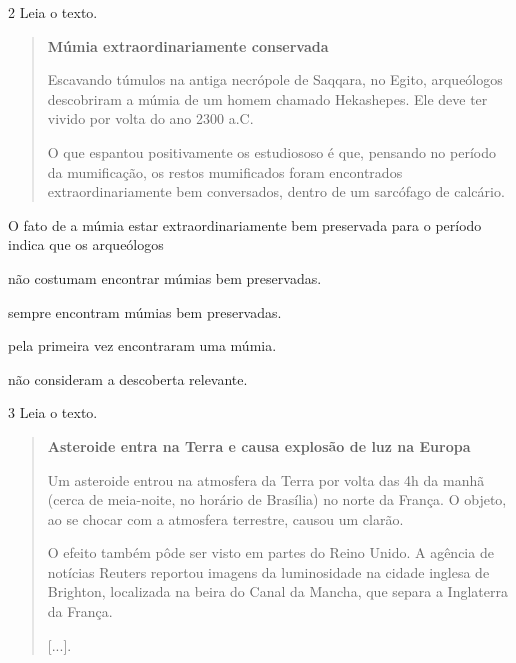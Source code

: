 
\num{2} Leia o texto.

\begin{quote}
\textbf{Múmia extraordinariamente conservada}

Escavando túmulos na antiga necrópole de Saqqara, no Egito, arqueólogos descobriram a múmia de um homem chamado Hekashepes. Ele deve ter vivido por volta do ano 2300 a.C.

O que espantou positivamente os estudiososo é que, pensando no período da mumificação, os restos mumificados foram encontrados extraordinariamente bem conversados, dentro de um sarcófago de calcário.

\end{quote}

O fato de a múmia estar extraordinariamente bem preservada para o período
indica que os arqueólogos

\begin{escolha}
\item não costumam encontrar múmias bem preservadas.

\item sempre encontram múmias bem preservadas.

\item pela primeira vez encontraram uma múmia.

\item não consideram a descoberta relevante.
\end{escolha}


\pagebreak
\num{3} Leia o texto.

\begin{quote}
\textbf{Asteroide entra na Terra e causa explosão de luz na Europa}

Um asteroide entrou na atmosfera da Terra por volta das 4h da manhã
(cerca de meia-noite, no horário de Brasília) no norte da França. O
objeto, ao se chocar com a atmosfera terrestre, causou um clarão.

O efeito também pôde ser visto em partes do Reino Unido. A agência de
notícias Reuters reportou imagens da luminosidade na cidade inglesa de
Brighton, localizada na beira do Canal da Mancha, que separa a
Inglaterra da França.

{[}...{]}.

\end{quote}

